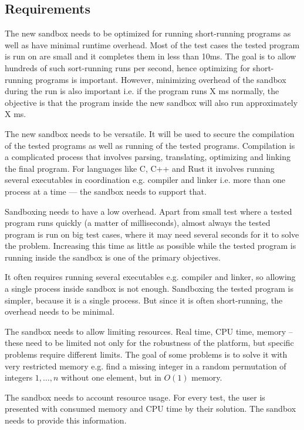 \documentclass[en]{pracamgr}
\begin{document}
\subsection{Requirements}

The new sandbox needs to be optimized for running short-running programs as well as have minimal runtime overhead. Most of the test cases the tested program is run on are small and it completes them in less than 10ms. The goal is to allow hundreds of such sort-running runs per second, hence optimizing for short-running programs is important. However, minimizing overhead of the sandbox during the run is also important i.e. if the program runs X ms normally, the objective is that the program inside the new sandbox will also run approximately X ms.

The new sandbox needs to be versatile. It will be used to secure the compilation of the tested programs as well as running of the tested programs. Compilation is a complicated process that involves parsing, translating, optimizing and linking the final program. For languages like C, C++ and Rust it involves running several executables in coordination e.g. compiler and linker i.e. more than one process at a time --- the sandbox needs to support that.

Sandboxing needs to have a low overhead. Apart from small test where a tested program runs quickly (a matter of milliseconds), almost always the tested program is run on big test cases, where it may need several seconds for it to solve the problem. Increasing this time as little as possible while the tested program is running inside the sandbox is one of the primary objectives.

It often requires running several executables e.g. compiler and linker, so allowing a single process inside sandbox is not enough. Sandboxing the tested program is simpler, because it is a single process. But since it is often short-running, the overhead needs to be minimal.

The sandbox needs to allow limiting resources. Real time, CPU time, memory -- these need to be limited not only for the robustness of the platform, but specific problems require different limits. The goal of some problems is to solve it with very restricted memory e.g. find a missing integer in a random permutation of integers $1, \ldots, n$ without one element, but in $O(1)$ memory.

The sandbox needs to account resource usage. For every test, the user is presented with consumed memory and CPU time by their solution. The sandbox needs to provide this information.
\end{document}
